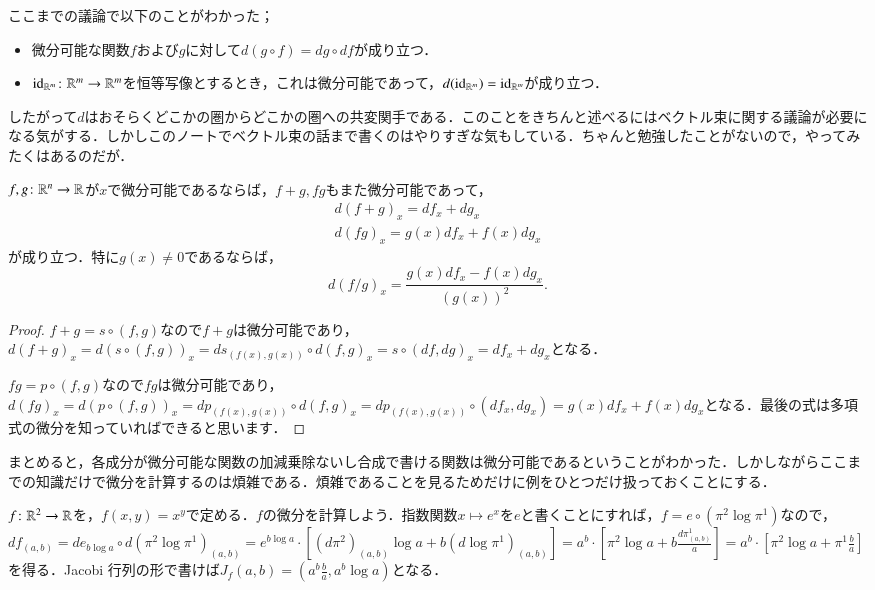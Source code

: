 \begin{que}[**]ここまでの議論で以下のことがわかった；
\begin{itemize}
\item 微分可能な関数$f$および$g$に対して$d(g \circ f) = dg \circ df$が成り立つ．
\item $\text{id}_{\mathbb{R}^m} \colon \mathbb{R}^m \to \mathbb{R}^m$を恒等写像とするとき，これは微分可能であって，$d(\text{id}_{\mathbb{R}^m}) = \text{id}_{\mathbb{R}^m}$が成り立つ．
\end{itemize}
したがって$d$はおそらくどこかの圏からどこかの圏への共変関手である．このことをきちんと述べるにはベクトル束に関する議論が必要になる気がする．しかしこのノートでベクトル束の話まで書くのはやりすぎな気もしている．ちゃんと勉強したことがないので，やってみたくはあるのだが．
\end{que}

\begin{cor}
$f, g \colon \mathbb{R}^n \to \mathbb{R}$が$x$で微分可能であるならば，$f+g, fg$もまた微分可能であって，
\begin{align}
d(f+g)_x = df_x+dg_x \\
d(fg)_x = g(x) df_x  + f(x) dg_x
\end{align}が成り立つ．特に$g (x) \neq 0$であるならば，
\begin{equation}
d(f/g)_x = \frac{g(x)df_x - f(x)dg_x}{(g(x))^2}.
\end{equation}
\end{cor}

\begin{proof}
$f+g = s \circ (f,g)$なので$f+g$は微分可能であり，$d(f+g)_x = d(s \circ (f,g))_x = ds_{(f(x), g(x))} \circ d(f,g)_x = s \circ (df,dg)_x = df_x + dg_x$となる．

$fg = p \circ(f,g)$なので$fg$は微分可能であり，$d(fg)_x = d(p \circ (f,g))_x = dp_{(f(x), g(x))} \circ d(f,g)_x = dp_{(f(x), g(x))} \circ (df_x,dg_x) = g(x)df_x  + f(x) dg_x$となる．最後の式は多項式の微分を知っていればできると思います．
\end{proof}

まとめると，各成分が微分可能な関数の加減乗除ないし合成で書ける関数は微分可能であるということがわかった．しかしながらここまでの知識だけで微分を計算するのは煩雑である．煩雑であることを見るためだけに例をひとつだけ扱っておくことにする．

\begin{exm}
$f \colon \mathbb{R}^2 \to \mathbb{R}$を，$f(x,y) = x^y$で定める．$f$の微分を計算しよう．指数関数$x \mapsto e^x$を$e$と書くことにすれば，$f = e \circ (\pi^2 \log \pi^1)$なので，$df _{(a,b)} = de_{b \log a} \circ d(\pi^2 \log \pi^1)_{(a,b)} 
= e^{b \log a} \cdot \left[ (d \pi^2 )_{(a,b)} \log a + b (d\log \pi^1)_{(a,b)} \right]
=a^b \cdot \left[ \pi^2 \log a + b  \frac{d \pi^1_{(a,b)}}{a} \right] = a^b\cdot \left[ \pi^2 \log a + \pi^1 \frac{b}{a} \right]$を得る．Jacobi 行列の形で書けば$J_f(a,b) = \left( a^b \frac{b}{a} , a^b \log a\right)$となる．
\end{exm}

